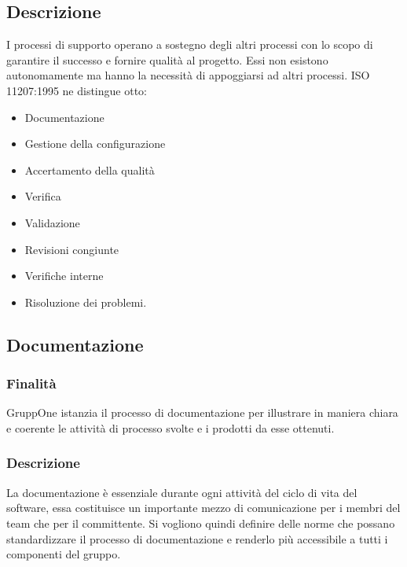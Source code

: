 \documentclass[../norme-di-progetto.tex]{subfiles}
\begin{document}
\subsection{Descrizione}%
\label{sub:processi_di_supporto/descrizione}

I processi di supporto operano a sostegno degli altri processi con lo scopo di garantire il successo e fornire qualità al progetto.
Essi non esistono autonomamente ma hanno la necessità di appoggiarsi ad altri processi.
ISO 11207:1995 ne distingue otto:

\begin{itemize}
  \item Documentazione
  \item Gestione della configurazione
  \item Accertamento della qualità
  \item Verifica
  \item Validazione
  \item Revisioni congiunte
  \item Verifiche interne
  \item Risoluzione dei problemi.
\end{itemize}

\subsection{Documentazione}%
\label{sub:documentazione}

\subsubsection{Finalità}%
\label{subs:documentazione/finalita}

GruppOne istanzia il processo di documentazione per illustrare in maniera chiara e coerente le attività di processo svolte e i prodotti da esse ottenuti.

\subsubsection{Descrizione}%
\label{subs:documentazione/descrizione}

La documentazione è essenziale durante ogni attività del ciclo di vita del software, essa costituisce un importante mezzo di comunicazione per i membri del team che per il committente.
Si vogliono quindi definire delle norme che possano standardizzare il processo di documentazione e renderlo più accessibile a tutti i componenti del gruppo.
\end{document}
